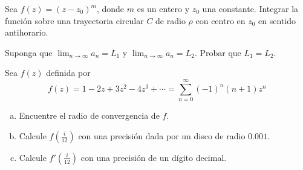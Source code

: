 \documentclass[11pt]{article}
\begin{document}
\begin{question}  %
Sea $f(z) = (z - z_0)^m$, donde $m$ es un entero y $z_0$ una constante. Integrar la función sobre una trayectoria circular $C$ de radio $\rho$ con centro en $z_0$ en sentido antihorario. 
\end{question}


\begin{question}%
    Suponga que $\lim_{n \rightarrow \infty} a_n = L_1$ y $\lim_{n \rightarrow \infty} a_n = L_2$. Probar que $L_1 = L_2$.
\end{question}

\begin{question}  %
Sea $f(z)$ definida por
\[ f(z) = 1 - 2 z + 3 z^2 -4 z^3 + \cdots = \sum_{n=0}^{\infty} (-1)^n (n + 1) z^n \]
\begin{enumerate}[a)]
    \item Encuentre el radio de convergencia de $f$.
    \item Calcule $f(\tfrac{i}{12})$ con una precisión dada por un disco de radio $0.001$.
    \item Calcule $f'(\tfrac{i}{12})$ con una precisión de un dígito decimal.
\end{enumerate}
\end{question}
\end{document}
